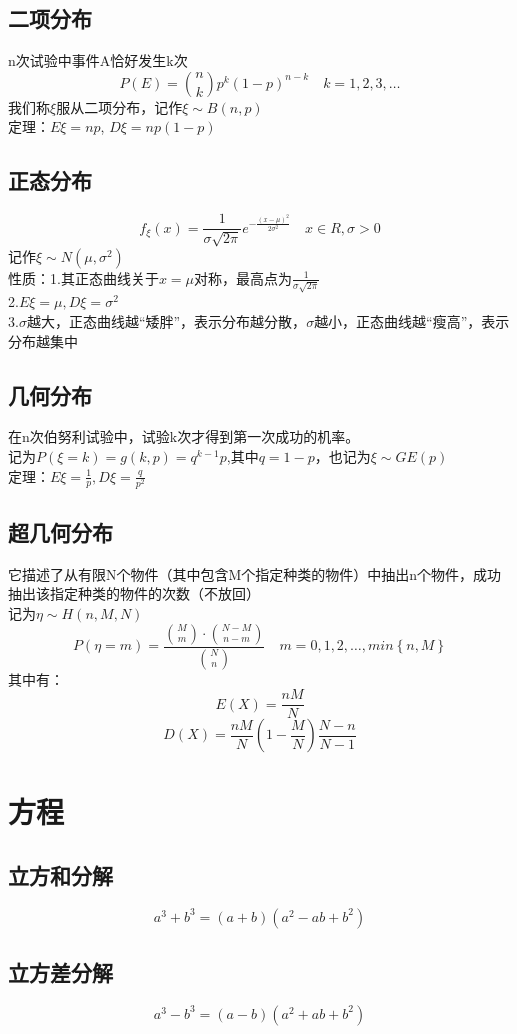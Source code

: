 \documentclass[UTF8]{ctexart}
\begin{document}
		\subsection{二项分布}
			n次试验中事件A恰好发生k次
			\[P(E) ={n \choose k}p^k (1-p)^{n-k}\quad k=1,2,3,\dots\]
			我们称$\xi$服从二项分布，记作$\xi \sim B(n,p)$\\
			定理：$E\xi = np$,	$D\xi = np(1-p)$
		\subsection{正态分布}
			\[f_\xi (x)=\frac{1}{\sigma\sqrt{2\pi}}e^{-\frac{(x-\mu)^2}{2\sigma ^2}} \quad x\in R,\sigma>0\]
			记作$\xi \sim N(\mu,\sigma ^2)$\\
			性质：1.其正态曲线关于$x=\mu$对称，最高点为$\frac{1}{\sigma\sqrt{2\pi}}$\\
			2.$E\xi=\mu,D\xi=\sigma ^2$\\
			3.$\sigma$越大，正态曲线越“矮胖”，表示分布越分散，$\sigma$越小，正态曲线越“瘦高”，表示分布越集中
		\subsection{几何分布}
			在n次伯努利试验中，试验k次才得到第一次成功的机率。\\
			记为$P(\xi=k)=g(k,p)=q^{k-1}p$,其中$q=1-p$，也记为$\xi \sim GE(p)$\\
			定理：$E\xi=\frac{1}{p},D\xi=\frac{q}{p^2}$
		\subsection{超几何分布}
			它描述了从有限N个物件（其中包含M个指定种类的物件）中抽出n个物件，成功抽出该指定种类的物件的次数（不放回）\\
			记为$\eta \sim H(n,M,N)$
			\[P\left ( \eta=m\right ) = \frac{\binom{M}{m}\cdot \binom{N-M}{n-m}}{\binom{N}{n}}\quad m=0,1,2,\dots,min \left\{ n,M \right\}\]
			其中有：
			\[E(X)=\frac{nM}{N}\]
			\[D(X)=\frac{nM}{N}\left(1-\frac{M}{N}\right)\frac{N-n}{N-1}\]


	\section{方程}
		\subsection{立方和分解}
			\[a^3+b^3=(a+b)(a^2-ab+b^2)\]
		\subsection{立方差分解}
			\[a^3-b^3=(a-b)(a^2+ab+b^2)\]
\end{document}
